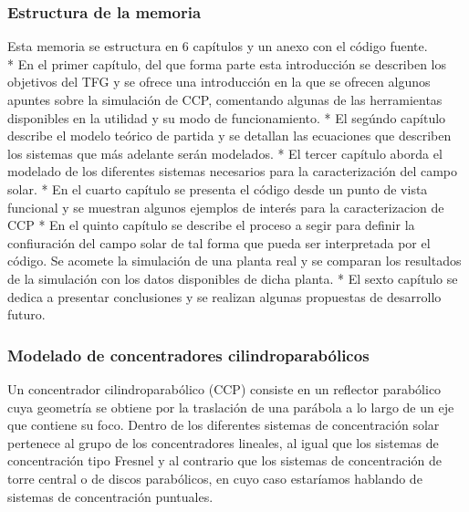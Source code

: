 \documentclass[11pt]{article}
\begin{document}
\hypertarget{estructura-de-la-memoria}{%
\subsubsection{Estructura de la
memoria}\label{estructura-de-la-memoria}}

Esta memoria se estructura en 6 capítulos y un anexo con el código
fuente.\\
* En el primer capítulo, del que forma parte esta introducción se
describen los objetivos del TFG y se ofrece una introducción en la que
se ofrecen algunos apuntes sobre la simulación de CCP, comentando
algunas de las herramientas disponibles en la utilidad y su modo de
funcionamiento. * El segúndo capítulo describe el modelo teórico de
partida y se detallan las ecuaciones que describen los sistemas que más
adelante serán modelados. * El tercer capítulo aborda el modelado de los
diferentes sistemas necesarios para la caracterización del campo solar.
* En el cuarto capítulo se presenta el código desde un punto de vista
funcional y se muestran algunos ejemplos de interés para la
caracterizacion de CCP * En el quinto capítulo se describe el proceso a
segir para definir la confiuración del campo solar de tal forma que
pueda ser interpretada por el código. Se acomete la simulación de una
planta real y se comparan los resultados de la simulación con los datos
disponibles de dicha planta. * El sexto capítulo se dedica a presentar
conclusiones y se realizan algunas propuestas de desarrollo futuro.

\hypertarget{modelado-de-concentradores-cilindroparabuxf3licos}{%
\subsubsection{Modelado de concentradores
cilindroparabólicos}\label{modelado-de-concentradores-cilindroparabuxf3licos}}

Un concentrador cilindroparabólico (CCP) consiste en un reflector
parabólico cuya geometría se obtiene por la traslación de una parábola a
lo largo de un eje que contiene su foco. Dentro de los diferentes
sistemas de concentración solar pertenece al grupo de los concentradores
lineales, al igual que los sistemas de concentración tipo Fresnel y al
contrario que los sistemas de concentración de torre central o de discos
parabólicos, en cuyo caso estaríamos hablando de sistemas de
concentración puntuales.
\end{document}
